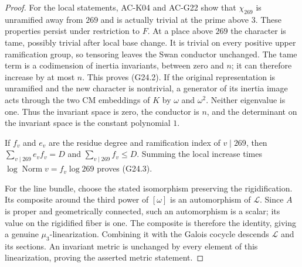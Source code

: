 \begin{proof}
For the local statements, AC-K04 and AC-G22 show that
$\chi_{269}$ is unramified away from $269$ and is actually
trivial at the prime above $3$.  These properties persist under
restriction to $F$.  At a place above $269$ the character is tame,
possibly trivial after local base change.  It is trivial on every
positive upper ramification group, so tensoring leaves the Swan
conductor unchanged.  The tame term is a codimension of inertia
invariants, between zero and $n$; it can therefore increase by at
most $n$.  This proves (G24.2).  If the original representation is
unramified and the new character is nontrivial, a generator of its
inertia image acts through the two CM embeddings of $K$ by
$\omega$ and $\omega^2$.  Neither eigenvalue is one.  Thus the
invariant space is zero, the conductor is $n$, and the determinant
on the invariant space is the constant polynomial $1$.

If $f_v$ and $e_v$ are the residue degree and ramification index
of $v\mid269$, then
$\sum_{v\mid269}e_vf_v=D$ and $\sum_{v\mid269}f_v\leq D$.
Summing the local increase times
$\log\operatorname{Norm}v=f_v\log269$ proves (G24.3).

For the line bundle, choose the stated isomorphism preserving the
rigidification.  Its composite around the third power of
$[\omega]$ is an automorphism of $\mathcal L$.  Since $A$ is
proper and geometrically connected, such an automorphism is a
scalar; its value on the rigidified fiber is one.  The composite
is therefore the identity, giving a genuine $\mu_3$-linearization.
Combining it with the Galois cocycle descends $\mathcal L$ and
its sections.  An invariant metric is unchanged by every element
of this linearization, proving the asserted metric statement.
\end{proof}

